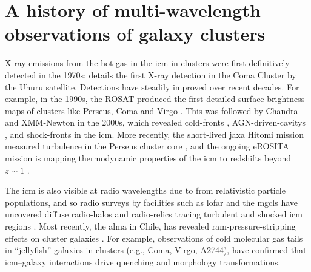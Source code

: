 \chapteropen
\chapter{A history of multi-wavelength observations of galaxy clusters}
\label{app:mw_obs}

X-ray emissions from the hot gas in the \gls{icm} in clusters were first definitively detected in the 1970s; \eg \citet{Gursky_1971} details the first X-ray detection in the Coma Cluster by the Uhuru satellite. Detections have steadily improved over recent decades. For example, in the 1990s, the \gls{ROSAT} produced the first detailed surface brightness maps of clusters like Perseus, Coma and Virgo \citep{Boehringer_1993,Bohringer_1994}. This was followed by Chandra and XMM-Newton in the 2000s, which revealed \glspl{cold-front} \citep{Markevitch_2000}, \glspl{AGN-driven-cavity} \citep{Fabian_2000}, and \glspl{shock-front} \citep{Vikhlinin_2001} in the \gls{icm}. More recently, the short-lived \gls{jaxa} Hitomi mission measured turbulence in the Perseus cluster core \citep{HitomiCollaboration_2016}, and the ongoing \gls{eROSITA} mission is mapping thermodynamic properties of the \gls{icm} to redshifts beyond $z \sim 1$ \citep{Bulbul_2024}. 

The \gls{icm} is also visible at radio wavelengths due to  from relativistic particle populations, and so radio surveys by facilities such as \gls{lofar} \citep{Cuciti_2022} and the \gls{mgcls} have uncovered diffuse \glspl{radio-halo} and \glspl{radio-relic} tracing turbulent and shocked \gls{icm} regions \citep{Knowles_2022}. Most recently, the \gls{alma} in Chile, has revealed \gls{ram-pressure-stripping} effects on cluster galaxies \citep[\eg][]{Jachym_2014,Jachym_2017}. For example, observations of cold molecular gas tails in ``jellyfish'' galaxies \citep[\eg][]{Moretti_2020} in clusters (e.g., Coma, Virgo, A2744), have confirmed that \gls{icm}--galaxy interactions drive \gls{quenching} and morphology transformations.
